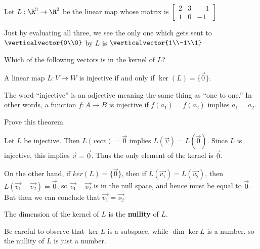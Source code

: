 \documentclass{ximera}
\begin{document}
\begin{question}
	Let $L:\R^3 \to \R^2$ be the linear map whose matrix is 
	\( \begin{bmatrix} 
		2 & 3 & \phantom{-}1\\
		1 & 0 & -1
	\end{bmatrix}\)
	\begin{solution}
		\begin{hint}
			Just by evaluating all three, we see the only one which gets sent to $\verticalvector{0\\0}$ by $L$ is $\verticalvector{1\\-1\\1}$
		\end{hint}
		Which of the following vectors is in the kernel of $L$?
		\begin{multiple-choice}
		\end{multiple-choice}
	\end{solution}
\end{question}

\begin{theorem}
  A linear map $L:V \to W$ is injective if and only if $\ker(L) = \{\vec{0}\}$.
\end{theorem}

\begin{definition}
  The word ``injective'' is an adjective meaning the same thing as ``one to one.''  In other words, a function $f:A \to B$ is injective if $f(a_1)=f(a_2)$ implies $a_1=a_2$.  
\end{definition}

Prove this theorem.
	
\begin{free-response}
	Let $L$ be injective.  Then $L(vec{v}) = \vec{0}$ implies $L(\vec{v}) = L(\vec{0})$.  Since $L$ is injective, this implies $\vec{v} = \vec{0}$.  Thus the only element
	of the kernel is $\vec{0}$.
	
	On the other hand, if $ker(L) = \{\vec{0}\}$, then if $L(\vec{v_1}) = L(\vec{v_2})$, then $L(\vec{v_1}-\vec{v_2})= \vec{0}$, so $\vec{v_1}-\vec{v_2}$
	 is in the null space, and hence must be equal to $\vec{0}$.  But then we can conclude that $\vec{v_1} = \vec{v_2}$
	\end{free-response}

\begin{definition}
  The dimension of the kernel of $L$ is the \textbf{nullity} of $L$.        
\end{definition}

Be careful to observe that $\ker L$ is a subspace, while $\dim \ker L$
is a number, so the nullity of $L$ is just a number.
\end{document}
